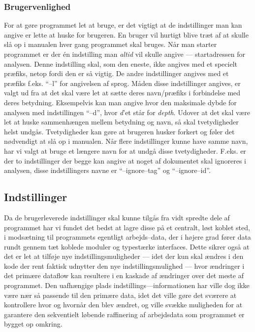 \documentclass[a4paper,oneside,article]{memoir}
\begin{document}
\subsubsection{Brugervenlighed}
For at gøre programmet let at bruge, er det vigtigt at de
indstillinger man kan angive er lette at huske for brugeren. En bruger
vil hurtigt blive træt af at skulle slå op i manualen hver gang
programmet skal bruges. Når man starter programmet er der én
indstilling man \textit{altid} vil skulle angive --- startadressen for
analysen. Denne indstilling skal, som den eneste, ikke angives med et
specielt præfiks, netop fordi den er så vigtig. De andre indstillinger
angives med et præfiks f.eks. ``--l'' for angivelsen af sprog. Måden
disse indstillinger angives, er valgt ud fra at det skal være let at
sætte deres navn/præfiks i forbindelse med deres
betydning. Eksempelvis kan man angive hvor den maksimale dybde for
analysen med indstillingen ``--d'', hvor \textit{d}'et står for
\textit{depth}. Udover at det skal være let at huske sammenhængen mellem
betydning og navn, så skal tvetydigheder helst undgås. Tvetydigheder
kan gøre at brugeren husker forkert og føler det
nødvendigt at slå op i manualen. Når flere indstillinger kunne have
samme navn, har vi valgt at bruge et længere navn for at undgå
disse tvetydigheder. F.eks. er der to indstillinger der begge kan
angive at noget af dokumentet skal ignoreres i analysen, disse
indstillingers navne er ``--ignore--tag'' og ``--ignore--id''.

\subsection{Indstillinger}
Da de brugerleverede indstillinger skal kunne tilgås fra vidt spredte
dele af programmet har vi fundet det bedst at lagre disse på et
centralt, løst koblet sted, i modsætning til programmets egentligt
arbejds--data, der i højere grad fører data rundt gennem tæt koblede
moduler og typestærke interfaces. Dette sikrer også at det er
let at tilføje nye indstillingsmuligheder --- idet der kun skal ændres
i den kode der rent faktisk udnytter den nye indstillingsmulighed ---
hvor ændringer i det primære dataflow kan resultere i en kaskade af
ændringer over det meste af programmet.  Den uafhængige plads
indstillings---informationen har ville dog ikke være nær så passende
til den primære data, idet det ville gøre det sværere at kontrollere
hvor og hvornår den blev ændret, og ville svække muligheden for at
garantere den sekventielt løbende raffinering af arbejdsdata som
programmet er bygget op omkring.
\end{document}
